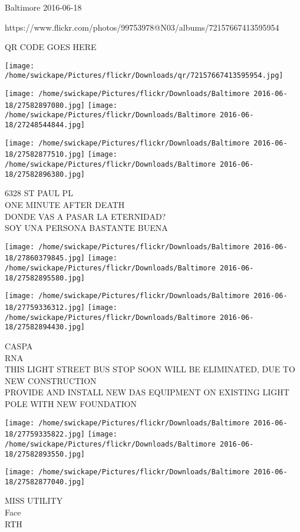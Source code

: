\documentclass[10pt,letterpaper]{article}
\begin{document}
Baltimore 2016-06-18

https://www.flickr.com/photos/99753978@N03/albums/72157667413595954

QR CODE GOES HERE

\texttt{[image: /home/swickape/Pictures/flickr/Downloads/qr/72157667413595954.jpg]}
\pagebreak

\texttt{[image: /home/swickape/Pictures/flickr/Downloads/Baltimore 2016-06-18/27582897080.jpg]}
\texttt{[image: /home/swickape/Pictures/flickr/Downloads/Baltimore 2016-06-18/27248544844.jpg]}

\texttt{[image: /home/swickape/Pictures/flickr/Downloads/Baltimore 2016-06-18/27582877510.jpg]}
\texttt{[image: /home/swickape/Pictures/flickr/Downloads/Baltimore 2016-06-18/27582896380.jpg]}

6328 ST PAUL PL\\
ONE MINUTE AFTER DEATH\\
DONDE VAS A PASAR LA ETERNIDAD?\\
SOY UNA PERSONA BASTANTE BUENA\\
\pagebreak

\texttt{[image: /home/swickape/Pictures/flickr/Downloads/Baltimore 2016-06-18/27860379845.jpg]}
\texttt{[image: /home/swickape/Pictures/flickr/Downloads/Baltimore 2016-06-18/27582895580.jpg]}

\texttt{[image: /home/swickape/Pictures/flickr/Downloads/Baltimore 2016-06-18/27759336312.jpg]}
\texttt{[image: /home/swickape/Pictures/flickr/Downloads/Baltimore 2016-06-18/27582894430.jpg]}

CASPA\\
RNA\\
THIS LIGHT STREET BUS STOP SOON WILL BE ELIMINATED, DUE TO NEW CONSTRUCTION\\
PROVIDE AND INSTALL NEW DAS EQUIPMENT ON EXISTING LIGHT POLE WITH NEW FOUNDATION\\
\pagebreak

\texttt{[image: /home/swickape/Pictures/flickr/Downloads/Baltimore 2016-06-18/27759335822.jpg]}
\texttt{[image: /home/swickape/Pictures/flickr/Downloads/Baltimore 2016-06-18/27582893550.jpg]}

\texttt{[image: /home/swickape/Pictures/flickr/Downloads/Baltimore 2016-06-18/27582877040.jpg]}

MISS UTILITY\\
Face\\
RTH\\
\pagebreak
\end{document}
